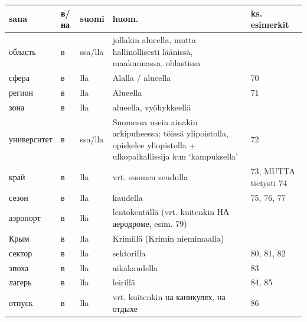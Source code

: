 \documentclass[]{scrreprt}
\begin{document}
\begin{longtable}[c]{@{}lllp{5cm}p{3cm}@{}}
\toprule
sana & в/на & suomi & huom. & ks. esimerkit\tabularnewline
\midrule
\endhead
область & в & ssa/lla & jollakin alueella, mutta hallinollisesti
läänissä, maakunnassa, oblastissa &\tabularnewline
сфера & в & lla & Alalla / alueella & 70\tabularnewline
регион & в & lla & Alueella & 71\tabularnewline
зона & в & lla & alueella, vyöhykkeellä &\tabularnewline
университет & в & ssa/lla & Suomessa usein ainakin arkipuheessa: töissä
ylipoistolla, opiskelee yliopistolla + ulkopaikallissija kun
`kampuksella' & 72\tabularnewline
край & в & lla & vrt. suomen seudulla & 73, MUTTA tietysti
74\tabularnewline
сезон & в & lla & kaudella & 75, 76, 77\tabularnewline
аэропорт & в & lla & lentokentällä (vrt. kuitenkin НА аеродроме, esim.
79) &\tabularnewline
Крым & в & lla & Krimillä (Krimin niemimaalla) &\tabularnewline
сектор & в & lla & sektorilla & 80, 81, 82\tabularnewline
эпоха & в & lla & aikakaudella & 83\tabularnewline
лагерь & в & lla & leirillä & 84, 85\tabularnewline
отпуск & в & lla & vrt. kuitenkin на каникулях, на отдыхе &
86\tabularnewline
\bottomrule
\end{longtable}
\end{document}
